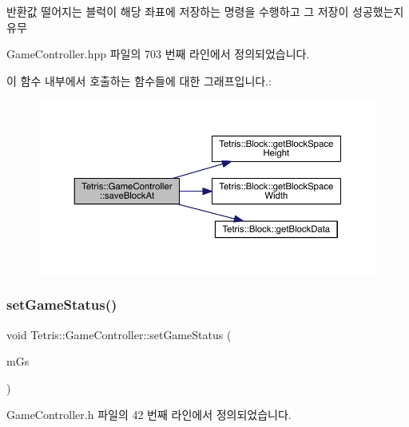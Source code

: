 \begin{DoxyReturn}{반환값}
떨어지는 블럭이 해당 좌표에 저장하는 명령을 수행하고 그 저장이 성공했는지유무 
\end{DoxyReturn}


Game\+Controller.\+hpp 파일의 703 번째 라인에서 정의되었습니다.

이 함수 내부에서 호출하는 함수들에 대한 그래프입니다.\+:
\nopagebreak
\begin{figure}[H]
\begin{center}
\leavevmode
\includegraphics[width=350pt]{class_tetris_1_1_game_controller_adc067380df0f0da4ea4a358d00d6a123_cgraph}
\end{center}
\end{figure}
\mbox{\label{class_tetris_1_1_game_controller_a013cef75ba09bdb7d95ae1df8497b8f5}} 
\subsubsection{\texorpdfstring{set\+Game\+Status()}{setGameStatus()}\hspace{0.1cm}{\footnotesize\ttfamily [1/2]}}
{\footnotesize\ttfamily void Tetris\+::\+Game\+Controller\+::set\+Game\+Status (\begin{DoxyParamCaption}\item[{\hyperlink{class_tetris_1_1_game_controller_a96a963b56385f3b3a122ff0ca2beb770}{Game\+Controller\+::\+Game\+Status}}]{m\+Gs }\end{DoxyParamCaption})\hspace{0.3cm}{\ttfamily [inline]}}



Game\+Controller.\+h 파일의 42 번째 라인에서 정의되었습니다.

